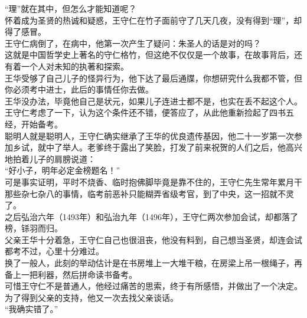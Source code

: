 \begin{multicols}{\theparacolNo}
“理”就在其中，但怎么才能知道呢？\\

怀着成为圣贤的热诚和疑惑，王守仁在竹子面前守了几天几夜，没有得到“理”，却得了感冒。\\

王守仁病倒了，在病中，他第一次产生了疑问：朱圣人的话是对的吗？\\

这就是中国哲学史上著名的守仁格竹，但这绝不仅仅是一个故事，在故事背后，还有着一个人对未知的执著和探索。\\

王华受够了自己儿子的怪异行为，他下达了最后通牒，你想研究什么我都不管，但你必须考中进士，此后的事情任你去做。\\

王华没办法，毕竟他自己是状元，如果儿子连进士都不是，也实在丢不起这个人。\\

王守仁考虑了一下，认为这个条件还不错，便答应了，从此他重新捡起了四书五经，开始备考。\\

聪明人就是聪明人，王守仁确实继承了王华的优良遗传基因，他二十一岁第一次参加乡试，就中了举人。老爹终于露出了笑脸，打发了前来祝贺的人们之后，他高兴地拍着儿子的肩膀说道：\\

“好小子，明年必定金榜题名！”\\

可是事实证明，平时不烧香、临时抱佛脚毕竟是靠不住的，王守仁先生常年累月干那些杂七杂八的事情，临考前恶补只能糊弄省级考官，到了中央，这一招就不灵了。\\

之后弘治六年（1493年）和弘治九年（1496年），王守仁两次参加会试，却都落了榜，铩羽而归。\\

父亲王华十分着急，王守仁自己也很沮丧，他没有料到，自己想当圣贤，却连会试都考不过，心里十分难过。\\

换了一般人，此刻的举动估计是在书房堆上一大堆干粮，在房梁上吊一根绳子，再备上一把利器，然后拼命读书备考。\\

可惜王守仁不是普通人，他经过痛苦的思索，终于有所感悟，并做出了一个决定。\\

为了得到父亲的支持，他又一次去找父亲谈话。\\

“我确实错了。”\\


\end{multicols}
